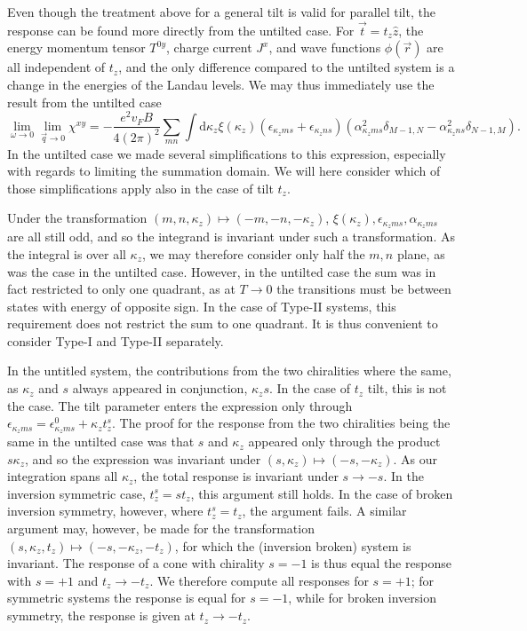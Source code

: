 Even though the treatment above for a general tilt is valid for parallel tilt, the response can be found more directly from the untilted case.
For \( \vec{t} = t_z \hat{z} \), the energy momentum tensor \( T^{0y} \), charge current \( J^x \), and wave functions \( \phi(\vec{r}) \) are all independent of \( t_z \), and the only difference compared to the untilted system is a change in the energies of the Landau levels.
We may thus immediately use the result from the untilted case
\begin{equation}
  \label{eq:129}
  \lim_{\omega \to 0} \lim_{\vec{q} \to 0} \chi^{xy} =
  - \frac{e^2 v_F B}{4(2\pi)^2}
  \sum\limits_{mn} \int \mathrm{d} \kappa_z
  \xi(\kappa_z)
  (\epsilon_{\kappa_z m s} + \epsilon_{\kappa_z n s})
  (\alpha_{\kappa_z m s}^2 \delta_{M-1, N} - \alpha_{\kappa_z n s}^2 \delta_{N-1, M}).
\end{equation}
In the untilted case we made several simplifications to this expression, especially with regards to limiting the summation domain.
We will here consider which of those simplifications apply also in the case of tilt \( t_z \).

Under the transformation \( (m,n,\kappa_z) \mapsto (-m, -n , -\kappa_z) \), \( \xi(\kappa_z), \epsilon_{\kappa_z m s}, \alpha_{\kappa_z m s} \) are all still odd, and so the integrand is invariant under such a transformation.
As the integral is over all \( \kappa_z \), we may therefore consider only half the \( m,n \) plane, as was the case in the untilted case.
However, in the untilted case the sum was in fact restricted to only one quadrant, as at \( T\to 0 \) the transitions must be between states with energy of opposite sign.
In the case of Type-II systems, this requirement does not restrict the sum to one quadrant.
It is thus convenient to consider Type-I and Type-II separately.

In the untitled system, the contributions from the two chiralities where the same, as \( \kappa_z \) and \( s \) always appeared in conjunction, \( \kappa_z s \).
In the case of \( t_z \) tilt, this is not the case.
The tilt parameter enters the expression only through \( \epsilon_{\kappa_z m s} = \epsilon_{\kappa_z m s}^0 + \kappa_z t^s_z \).
The proof for the response from the two chiralities being the same in the untilted case was that \( s \) and \( \kappa_z \) appeared only through the product \( s \kappa_z \), and so the expression was invariant under \( (s, \kappa_z) \mapsto (-s, -\kappa_z) \).
As our integration spans all \( \kappa_z \), the total response is invariant under \( s \to -s \).
In the inversion symmetric case, \( t^s_z = s t_z \), this argument still holds.
In the case of broken inversion symmetry, however, where \( t^s_z = t_z \), the argument fails.
A similar argument may, however, be made for the transformation \( (s, \kappa_z, t_z) \mapsto (-s, -\kappa_z, -t_z) \), for which the (inversion broken) system is invariant.
The response of a cone with chirality \( s = -1 \) is thus equal the response with \( s = +1 \) and \( t_z \to -t_z \).
We therefore compute all responses for \( s=+1 \);
for symmetric systems the response is equal for \( s=-1 \), while for broken inversion symmetry, the response is given at \( t_z \to -t_z \).

